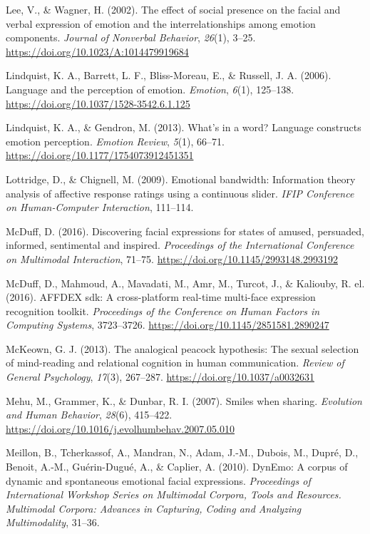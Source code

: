 \documentclass[
  english,
  doc]{apa7}
\newlength{\cslhangindent}
\newenvironment{cslreferences}%
  {\setlength{\parindent}{0pt}%
  \everypar{\setlength{\hangindent}{\cslhangindent}}\ignorespaces}%
  {\par}
\begin{document}
\begin{cslreferences}
\leavevmode\hypertarget{ref-lee2002effect}{}%
Lee, V., \& Wagner, H. (2002). The effect of social presence on the facial and verbal expression of emotion and the interrelationships among emotion components. \emph{Journal of Nonverbal Behavior}, \emph{26}(1), 3--25. \url{https://doi.org/10.1023/A:1014479919684}

\leavevmode\hypertarget{ref-lindquist2006language}{}%
Lindquist, K. A., Barrett, L. F., Bliss-Moreau, E., \& Russell, J. A. (2006). Language and the perception of emotion. \emph{Emotion}, \emph{6}(1), 125--138. \url{https://doi.org/10.1037/1528-3542.6.1.125}

\leavevmode\hypertarget{ref-lindquist2013s}{}%
Lindquist, K. A., \& Gendron, M. (2013). What's in a word? Language constructs emotion perception. \emph{Emotion Review}, \emph{5}(1), 66--71. \url{https://doi.org/10.1177/1754073912451351}

\leavevmode\hypertarget{ref-lottridge2009emotional}{}%
Lottridge, D., \& Chignell, M. (2009). Emotional bandwidth: Information theory analysis of affective response ratings using a continuous slider. \emph{IFIP Conference on Human-Computer Interaction}, 111--114.

\leavevmode\hypertarget{ref-mcduff2016discovering}{}%
McDuff, D. (2016). Discovering facial expressions for states of amused, persuaded, informed, sentimental and inspired. \emph{Proceedings of the International Conference on Multimodal Interaction}, 71--75. \url{https://doi.org/10.1145/2993148.2993192}

\leavevmode\hypertarget{ref-mcduff2016affdex}{}%
McDuff, D., Mahmoud, A., Mavadati, M., Amr, M., Turcot, J., \& Kaliouby, R. el. (2016). AFFDEX sdk: A cross-platform real-time multi-face expression recognition toolkit. \emph{Proceedings of the Conference on Human Factors in Computing Systems}, 3723--3726. \url{https://doi.org/10.1145/2851581.2890247}

\leavevmode\hypertarget{ref-mckeown2013analogical}{}%
McKeown, G. J. (2013). The analogical peacock hypothesis: The sexual selection of mind-reading and relational cognition in human communication. \emph{Review of General Psychology}, \emph{17}(3), 267--287. \url{https://doi.org/10.1037/a0032631}

\leavevmode\hypertarget{ref-mehu2007smiles}{}%
Mehu, M., Grammer, K., \& Dunbar, R. I. (2007). Smiles when sharing. \emph{Evolution and Human Behavior}, \emph{28}(6), 415--422. \url{https://doi.org/10.1016/j.evolhumbehav.2007.05.010}

\leavevmode\hypertarget{ref-meillon2010dynemo}{}%
Meillon, B., Tcherkassof, A., Mandran, N., Adam, J.-M., Dubois, M., Dupré, D., Benoit, A.-M., Guérin-Dugué, A., \& Caplier, A. (2010). DynEmo: A corpus of dynamic and spontaneous emotional facial expressions. \emph{Proceedings of International Workshop Series on Multimodal Corpora, Tools and Resources. Multimodal Corpora: Advances in Capturing, Coding and Analyzing Multimodality}, 31--36.


\end{cslreferences}
\end{document}

